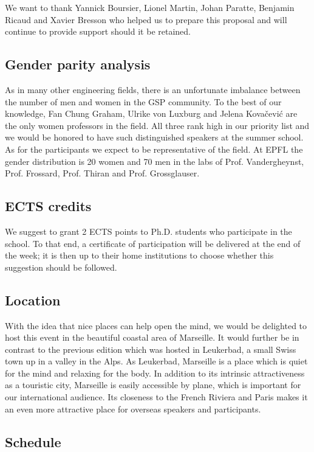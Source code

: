 \documentclass[a4paper]{scrartcl}
\begin{document}
We want to thank Yannick Boursier, Lionel Martin, Johan Paratte, Benjamin Ricaud
and Xavier Bresson who helped us to prepare this proposal and will continue to
provide support should it be retained.

\subsection{Gender parity analysis}

As in many  other engineering fields, there is an unfortunate imbalance between the number of men and women in the GSP community. To the best of our knowledge, Fan Chung Graham, Ulrike von Luxburg and Jelena Kovačević are the only women professors in the field. All three rank high in our priority list and we would be honored to have such distinguished speakers at the summer school. As for the participants we expect to be representative of the field. At EPFL the gender distribution is 20 women and 70 men in the labs of Prof. Vandergheynst, Prof. Frossard, Prof. Thiran and Prof. Grossglauser.

\subsection{ECTS credits}

We suggest to grant 2 ECTS points to Ph.D. students who participate in the
school. To that end, a certificate of participation will be delivered at the end
of the week; it is then up to their home institutions to choose whether this
suggestion should be followed.

\subsection{Location}

With the idea that nice places can help open the mind, we would be delighted to
host this event in the beautiful coastal area of Marseille. It would further be
in contrast to the previous edition which was hosted in Leukerbad, a small Swiss
town up in a valley in the Alps. As Leukerbad, Marseille is a place which is
quiet for the mind and relaxing for the body. 
In addition to its intrinsic attractiveness as a touristic city, Marseille is
easily accessible by plane, which is important for our international audience.
Its closeness to the French Riviera and Paris makes it an even more attractive
place for overseas speakers and participants.

\subsection{Schedule}
\end{document}
